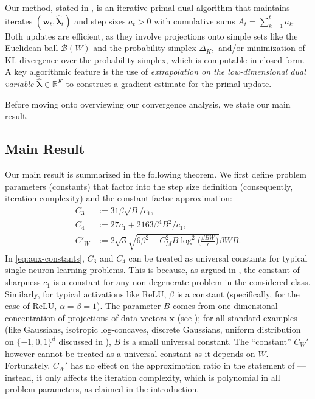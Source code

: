 \documentclass[11pt]{article}
\newcounter{thm}
\numberwithin{thm}{section}
\theoremstyle{plain}
\theoremstyle{definition}
\theoremstyle{remark} \newtheorem{remark}[thm]{Remark}
\def\eps{{\epsilon}}
\def\vlambda{{\bm{\lambda}}}
\def\vw{{\bm{w}}}
\def\vx{{\bm{x}}}
\def\cB{{\mathcal{B}}}
\newcommand{\R}{\mathbb{R}}
\newcommand{\evlambda}{\widehat{\vlambda}}
\begin{document}
Our method, stated in , is an iterative primal-dual algorithm that maintains iterates $(\vw_t, \evlambda_t)$ and step sizes $a_t > 0$ with cumulative sums $A_t = \sum_{k=1}^t a_k$. Both updates are efficient, as they involve projections onto simple sets like the Euclidean ball $\cB(W)$ and the probability simplex $\Delta_K,$ and/or minimization of KL divergence over the probability simplex, which is computable in closed form.  
A key algorithmic feature is the use of \emph{extrapolation on the low-dimensional dual variable} $\evlambda \in \R^K$ to construct a gradient estimate for the primal update. 

Before moving onto overviewing our convergence analysis, we state our main result.

\subsection{Main Result}

Our main result is summarized in the following theorem. We first define problem parameters (constants) that factor into the step size definition (consequently, iteration complexity) and the constant factor approximation:
\begin{equation}\label{eq:aux-constants}
    \begin{aligned}
        C_{3} &:=31\beta\sqrt{B}/c_{1},\\
        C_{4} &:=27c_1+2163\beta^4B^2/c_1,\\
        C'_W &:=2\sqrt{3}\sqrt{6\beta^2 + C_M^2B\log^2\Big(\frac{\beta BW}{\eps}\Big)} \beta WB.
    \end{aligned}
\end{equation}
In \eqref{eq:aux-constants}, $C_3$ and $C_4$ can be treated as universal constants for typical single neuron learning problems. This is because, as argued in \citep{wang2023robustly-learning}, the constant of sharpness $c_1$ is a constant for any non-degenerate problem in the considered class. Similarly, for typical activations like ReLU, $\beta$ is a constant (specifically, for the case of ReLU, $\alpha = \beta = 1$). The parameter $B$ comes from one-dimensional concentration of projections of data vectors $\vx$ (see ); for all standard examples (like Gaussians, isotropic log-concaves, discrete Gaussians, uniform distribution on $\{-1, 0, 1\}^d$ discussed in \citep{wang2023robustly-learning}), $B$ is a small universal constant. The ``constant'' $C_{W}'$  however cannot be treated as a universal constant as it depends on $W.$ Fortunately, $C_{W}'$ has no effect on the approximation ratio in the statement of ---instead, it only affects the iteration complexity, which is polynomial in all problem parameters, as claimed in the introduction.  
\end{document}
